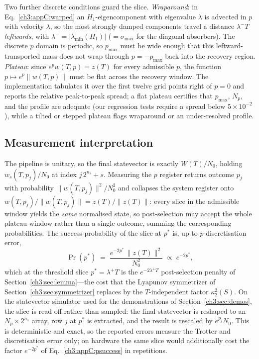 Two further discrete conditions guard the slice.  \emph{Wraparound}: in
Eq.~\eqref{ch3:appC:warped} an $H_1$-eigencomponent with eigenvalue $\lambda$
is advected in $p$ with velocity $\lambda$, so the most strongly damped
components travel a distance $\lambda^{-}T$ \emph{leftwards}, with
$\lambda^{-} = \lvert\lambda_{\min}(H_1)\rvert$ ($=\sigma_{\max}$ for the
diagonal absorbers).  The discrete $p$ domain is periodic, so
$p_{\max}$ must be wide enough that this leftward-transported mass does
not wrap through $p=-p_{\max}$ back into the recovery region.
\emph{Plateau}: since $e^{p}w(T,p) = z(T)$ for every admissible $p$, the
function $p\mapsto e^{p}\lVert w(T,p)\rVert$ must be flat across the
recovery window.  The implementation tabulates it over the first twelve
grid points right of $p=0$ and reports the relative peak-to-peak spread;
a flat plateau certifies that $p_{\max}$, $N_p$, and the profile are
adequate (our regression tests require a spread below $5\times10^{-2}$),
while a tilted or stepped plateau flags wraparound or an under-resolved
profile.

\subsection{Measurement interpretation}
\label{ch3:appC:measure}

The pipeline is unitary, so the final statevector is exactly
$W(T)/N_0$, holding $w_s(T,p_j)/N_0$ at index $j\,2^{n_s}+s$.  Measuring
the $p$ register returns outcome $p_j$ with probability
$\lVert w(T,p_j)\rVert^{2}/N_0^{2}$ and collapses the system register
onto $w(T,p_j)/\lVert w(T,p_j)\rVert = z(T)/\lVert z(T)\rVert$: every
slice in the admissible window yields the \emph{same} normalised state,
so post-selection may accept the whole plateau window rather than a
single outcome, summing the corresponding probabilities.  The success
probability of the slice at $p^{*}$ is, up to $p$-discretisation error,
\begin{equation}
  \Pr(p^{*})
  \;=\; \frac{e^{-2p^{*}}\,\lVert z(T)\rVert^{2}}{N_0^{2}}
  \;\propto\; e^{-2p^{*}},
  \label{ch3:appC:psuccess}
\end{equation}
which at the threshold slice $p^{*} = \lambda^{+}T$ is the
$e^{-2\lambda^{+}T}$ post-selection penalty of Section~\ref{ch3:sec:lemma}---the
cost that the Lyapunov symmetrizer of Section~\ref{ch3:sec:symmetrizer} replaces
by the $T$-independent factor $\kappa_2^{2}(S)$.  On the statevector
simulator used for the demonstrations of Section~\ref{ch3:sec:demos}, the slice
is read off rather than sampled: the final statevector is reshaped to an
$N_p\times2^{n_s}$ array, row $j$ at $p^{*}$ is extracted, and the result
is rescaled by $e^{p_j}N_0$.  This is deterministic and exact, so the
reported errors measure the Trotter and discretisation error only; on
hardware the same slice would additionally cost the factor
$e^{-2p^{*}}$ of Eq.~\eqref{ch3:appC:psuccess} in repetitions.
